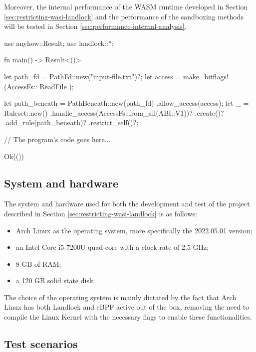 Moreover, the internal performance of the WASM runtime developed in Section \ref{sec:restricting-wasi-landlock}
and the performance of the sandboxing methods will be tested in Section \ref{sec:performance-internal-analysis}.

\vspace*{0.5cm}
\begin{code}[language=Rust, caption=An example of a program restricted with Landlock., label=lst:test-program-landlock-example]
use anyhow::Result;
use landlock::*;

fn main() -> Result<()> {
    let path_fd = PathFd::new("input-file.txt")?;
    let access = make_bitflags!(AccessFs::{ ReadFile });
    
    let path_beneath = PathBeneath::new(path_fd)
      .allow_access(access);
    let _ = Ruleset::new()
        .handle_access(AccessFs::from_all(ABI::V1))?
        .create()?
        .add_rule(path_beneath)?
        .restrict_self()?;

    // The program's code goes here...

    Ok(())
}
\end{code}

\subsection{System and hardware}

The system and hardware used for both the development and test of the project described in Section \ref{sec:restricting-wasi-landlock}
is as follows:
\begin{itemize}
  \item Arch Linux \cite{arch-linux} as the operating system, more specifically the 2022.05.01 version;
  \item an Intel Core i5-7200U quad-core with a clock rate of 2.5 GHz;
  \item 8 GB of RAM;
  \item a 120 GB solid state disk.
\end{itemize}

The choice of the operating system is mainly dictated by the fact that Arch Linux has both Landlock and eBPF active
out of the box, removing the need to compile the Linux Kernel with the necessary flags to enable these
functionalities.

\subsection{Test scenarios}
\label{sec:performance-test-description}

